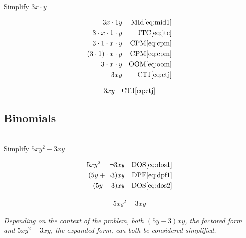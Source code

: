 \begin{example}[id:20141108-180608] \label{20141108-180608}  \hfill \\

Simplify $3x \cdot y$

\soln

\solnsteps
\begin{align*}
3x \cdot 1y && \text{MId} \eqref{eq:mid1} \\
3 \cdot x \cdot 1 \cdot y && \text{JTC} \eqref{eq:jtc} \\
3 \cdot 1 \cdot x \cdot y && \text{CPM} \eqref{eq:cpm} \\
(3 \cdot 1) \cdot x \cdot y && \text{CPM} \eqref{eq:cpm} \\
3 \cdot x \cdot y && \text{OOM} \eqref{eq:oom} \\
3xy && \text{CTJ} \eqref{eq:ctj} 
\end{align*}

\soln

\lesssteps
\begin{align*}
3xy && \text{CTJ} \eqref{eq:ctj}  
\end{align*}

\end{example}

\subsection*{Binomials}

\begin{example}[id:20141106-151622] \label{20141106-151622}  \hfill \\

Simplify $5xy^2-3xy$

\soln

\solnsteps
\begin{align*}
5xy^2+\neg 3xy && \text{DOS} \eqref{eq:dos1} \\
(5y+\neg 3)xy && \text{DPF} \eqref{eq:dpf1} \\
(5y-3)xy && \text{DOS} \eqref{eq:dos2} 
\end{align*}

\soln

\lesssteps
\begin{align*}
5xy^2-3xy 
\end{align*}

\emph{Depending on the context of the problem, both $(5y-3)xy$, the factored form and $5xy^2-3xy$, the expanded form, can both be considered simplified.  }

\end{example}

